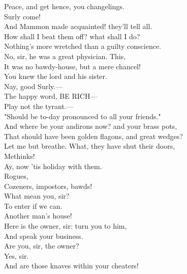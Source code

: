 \documentclass[a4paper,oneside]{memoir}
\begin{document}
\begin{drama*}
\lovewitspeaks Peace, and get hence, you changelings.\\
\facespeaks {}  Surly come!\\
And Mammon made acquainted! they'll tell all.\\
How shall I beat them off? what shall I do?\\
Nothing's more wretched than a guilty conscience.\\
\surlyspeaks No, sir, he was a great physician. This,\\
It was no bawdy-house, but a mere chancel!\\
You knew the lord and his sister.\\
\mammonspeaks {} Nay, good Surly.---\\
\surlyspeaks The happy word, BE RICH---\\
\mammonspeaks {} Play not the tyrant.---\\
\surlyspeaks "Should be to-day pronounced to all your friends."\\
And where be your andirons now? and your brass pots,\\
That should have been golden flagons, and great wedges?\\
\mammonspeaks Let me but breathe. What, they have shut their doors,\\
Methinks!\\
\surlyspeaks {} Ay, now 'tis holiday with them.\\
\mammonspeaks Rogues,\\
 Cozeners, impostors, bawds!\\
\facespeaks {} What mean you, sir?\\
\mammonspeaks To enter if we can.\\
\facespeaks {} Another man's house!\\
Here is the owner, sir: turn you to him,\\
And speak your business.\\
\mammonspeaks {} Are you, sir, the owner?\\
\lovewitspeaks Yes, sir.\\
\mammonspeaks {} And are those knaves within your cheaters!\\

\end{drama*}
\end{document}
